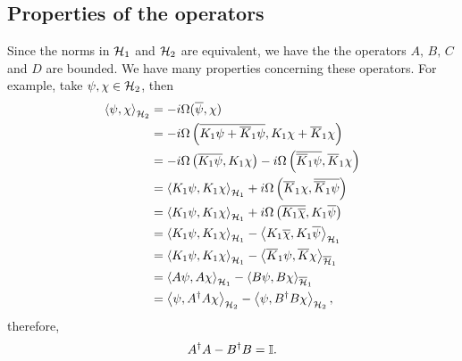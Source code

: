 \subsection*{Properties of the operators}
Since the norms in \({\mathcal{H}}_1\) and \({\mathcal{H}}_2\) are equivalent, we have the the operators \(A,\,B,\,C\) and \(D\) are bounded. We have many properties concerning these operators. For example, take \(\psi,\chi\in{\mathcal{H}}_2\), then
\begin{subequations}
    \begin{align}
        \left\langle \psi, \chi\right\rangle_{{\mathcal{H}}_2}&=-i\Omega(\overline{\psi},\chi)\\
        &=-i\Omega\left(\overline{K_1\psi+\overline{K}_1\psi},K_1\chi+\overline{K}_1\chi\right)\\
        &=-i\Omega\left(\overline{K_1\psi},K_1\chi\right)-i\Omega\left(\overline{\overline{K}_1\psi},\overline{K}_1\chi\right)\\
        &=\left\langle K_1\psi, K_1\chi\right\rangle_{{\mathcal{H}}_1}+i\Omega\left(\overline{K}_1\chi,\overline{\overline{K}_1\psi}\right)\\
        &=\left\langle K_1\psi, K_1\chi\right\rangle_{{\mathcal{H}}_1}+i\Omega\left(\overline{K_1\overline{\chi}},K_1\overline{\psi}\right)\\
        &=\left\langle K_1\psi, K_1\chi\right\rangle_{{\mathcal{H}}_1}-\left\langle K_1\overline{\chi}, K_1\overline{\psi}\right\rangle_{{\mathcal{H}}_1}\\
        &=\left\langle K_1\psi, K_1\chi\right\rangle_{{\mathcal{H}}_1}-\left\langle \overline{K}_1\psi, \overline{K}\chi\right\rangle_{\overline{{\mathcal{H}}}_1}\\
        &=\left\langle A\psi, A\chi\right\rangle_{{\mathcal{H}}_1}-\left\langle B\psi, B\chi\right\rangle_{\overline{{\mathcal{H}}}_1}\\
        &=\left\langle \psi, A^\dagger A\chi\right\rangle_{{\mathcal{H}}_2}-\left\langle \psi, B^{\dagger} B\chi\right\rangle_{{\mathcal{H}}_2},
    \end{align}
\end{subequations}
therefore,
\begin{equation}\label{eq:condAB1}
    A^{\dagger}A-B^\dagger B={\mathbb{I}}.
\end{equation}


